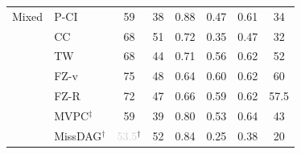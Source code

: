 \begin{tabular}{llcccccc}
    \midrule
    Mixed     & P-CI               & 59 & 38 & 0.88 & 0.47 & 0.61 & 34 \\
              & CC                 & 68 & 51 & 0.72 & 0.35 & 0.47 & 32 \\
              & TW                 & 68 & 44 & 0.71 & 0.56 & 0.62 & 52 \\
              & FZ-v               & 75 & 48 & 0.64 & 0.60 & 0.62 & 60 \\
              & FZ-R               & 72 & 47 & 0.66 & 0.59 & 0.62 & 57.5 \\
              & MVPC$^\ddagger$    & 59 & 39 & 0.80 & 0.53 & 0.64 & 43 \\
              & MissDAG$^\dagger$  & \textcolor{lightgray}{53.5}$^\dagger$ & 52 & 0.84 & 0.25 & 0.38 & 20 \\
    \bottomrule
\end{tabular}
